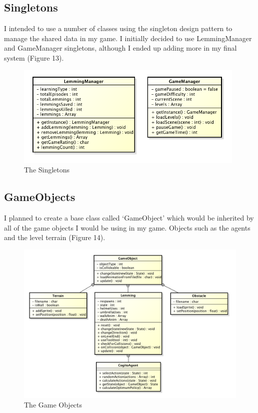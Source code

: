 \documentclass[a4paper,oneside]{report}
\begin{document}
\subsection{Singletons}

I intended to use a number of classes using the singleton design pattern to manage the shared data in my game. I initially decided to use LemmingManager and GameManager singletons, although I ended up adding more in my final system (Figure 13).

\begin{figure}[h!]
  \centering
    \includegraphics[width=110mm]{sources/images/Singletons}
    \caption{The Singletons}
\end{figure}

\subsection{GameObjects}

I planned to create a base class called `GameObject' which would be inherited by all of the game objects I would be using in my game. Objects such as the agents and the level terrain (Figure 14).

\begin{figure}[h!]
  \centering
    \includegraphics[width=140mm]{sources/images/GameObjects}
    \caption{The Game Objects}
\end{figure}
	
\end{document}
